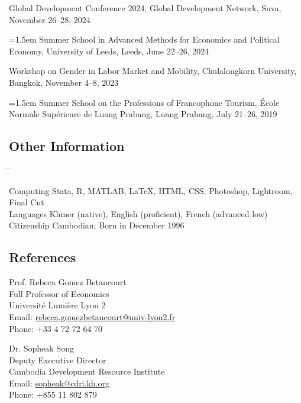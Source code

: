\documentclass[10pt,a4paper]{article}
\newcommand{\tabbedblock}[1]{

	\begin{tabbing}
		\hspace{2cm} \= \hspace{4cm} \= \kill
		#1
	\end{tabbing}
}
\begin{document}
Global Development Conference 2024, Global Development Network, Suva, November 26--28, 2024 

\hangindent=1.5em
Summer School in Advanced Methods for Economics and Political Economy, University of Leeds, Leeds, June 22--26, 2024

Workshop on Gender in Labor Market and Mobility, Chulalongkorn University, Bangkok, November 4--8, 2023

\hangindent=1.5em
Summer School on the Professions of Francophone Tourism, École Normale Supérieure de Luang Prabang, Luang Prabang, July 21–26, 2019



\subsection*{Other Information}

\tabbedblock{
	Computing \> Stata, R, MATLAB, \LaTeX, HTML, CSS, Photoshop, Lightroom, Final Cut\\
	
	Languages \> Khmer (native), English (proficient), French (advanced low)\\
	
	Citizenship \> Cambodian, Born in December 1996
}


\subsection*{References}		

\parbox{0.5\textwidth}{ %
	Prof. Rebeca Gomez Betancourt\\ 
	Full Professor of Economics\\ 
	Université Lumière Lyon 2\\
	Email: \href{mailto: Phone: rebeca.gomezbetancourt@univ-lyon2.fr}{rebeca.gomezbetancourt@univ-lyon2.fr}\\
	Phone: +33 4 72 72 64 70
}
\hfill %
\parbox{0.5\textwidth}{ %
	Dr. Sopheak Song\\ 
	Deputy Executive Director \\
	Cambodia Development Resource Institute\\ 
	Email: \href{mailto: sopheak@cdri.kh.org}{sopheak@cdri.kh.org}\\
	Phone: +855 11 802 879
}
\end{document}
